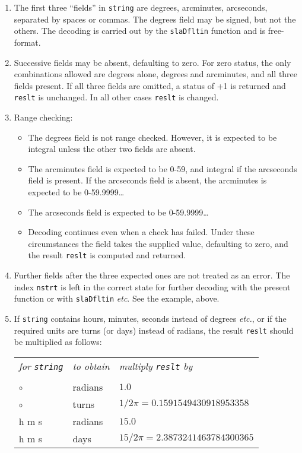 \documentclass[11pt,fleqn,twoside]{article}
\renewcommand{\_}{{\tt\char'137}}     %
\begin{document}
{
 \begin{enumerate}
  \item The first three ``fields'' in {\tt string} are degrees, arcminutes,
   arcseconds, separated by spaces or commas.  The degrees field
   may be signed, but not the others.  The decoding is carried
   out by the {\tt slaDfltin} function and is free-format.
  \item Successive fields may be absent, defaulting to zero.  For
   zero status, the only combinations allowed are degrees alone,
   degrees and arcminutes, and all three fields present.  If all
   three fields are omitted, a status of +1 is returned and {\tt reslt} is
   unchanged.  In all other cases {\tt reslt} is changed.
  \item Range checking:
   \begin{itemize}
    \item The degrees field is not range checked.  However, it is
     expected to be integral unless the other two fields are absent.
    \item The arcminutes field is expected to be 0-59, and integral if
     the arcseconds field is present.  If the arcseconds field
     is absent, the arcminutes is expected to be 0-59.9999\ldots
    \item The arcseconds field is expected to be 0-59.9999\ldots
    \item Decoding continues even when a check has failed.  Under these
     circumstances the field takes the supplied value, defaulting to
     zero, and the result {\tt reslt} is computed and returned.
   \end{itemize}
   \item Further fields after the three expected ones are not treated as
    an error.  The index {\tt nstrt} is left in the correct state for
    further decoding with the present function or with {\tt slaDfltin}
    {\it etc}.  See the example, above.
   \item If {\tt string} contains hours, minutes, seconds instead of
    degrees {\it etc.},
    or if the required units are turns (or days) instead of radians,
    the result {\tt reslt} should be multiplied as follows: \\ [1.5ex]
    \begin{tabular}{p{6em}p{5em}p{15em}}
    {\it for {\tt string}} & {\it to obtain} & {\it multiply {\tt reslt} by} \\ \\
    ${\circ}$~~\raisebox{-0.7ex}{$'$}~~\raisebox{-0.7ex}{$''$}
     & radians & $1.0$ \\
    ${\circ}$~~\raisebox{-0.7ex}{$'$}~~\raisebox{-0.7ex}{$''$}
     & turns & $1/{2 \pi} = 0.1591549430918953358$ \\
    h m s & radians & $15.0$ \\
    h m s & days & $15/{2\pi} = 2.3873241463784300365$ \\
   \end{tabular}
 \end{enumerate}
}
\end{document}
